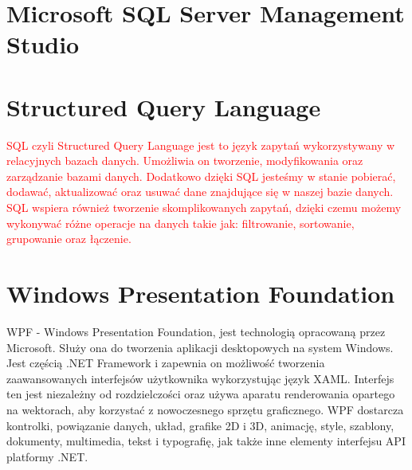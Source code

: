 \documentclass[12pt,oneside]{report}
\begin{document}
\section{Microsoft SQL Server Management Studio}

\section{Structured Query Language}
\textcolor{red} {SQL czyli Structured Query Language jest to język zapytań wykorzystywany w relacyjnych bazach danych. Umożliwia on tworzenie, modyfikowania oraz zarządzanie bazami danych. Dodatkowo dzięki SQL jesteśmy w stanie pobierać, dodawać, aktualizować oraz usuwać dane znajdujące się w naszej bazie danych. SQL wspiera również tworzenie skomplikowanych zapytań, dzięki czemu możemy wykonywać różne operacje na danych takie jak: filtrowanie, sortowanie, grupowanie oraz łączenie.}

\section{Windows Presentation Foundation}
WPF - Windows Presentation Foundation, jest technologią opracowaną przez Microsoft. Służy ona do tworzenia aplikacji desktopowych na system Windows. Jest częścią .NET Framework i zapewnia on możliwość tworzenia zaawansowanych interfejsów użytkownika wykorzystując język XAML. Interfejs ten jest niezależny od rozdzielczości oraz używa aparatu renderowania opartego na wektorach, aby korzystać z nowoczesnego sprzętu graficznego. WPF dostarcza kontrolki, powiązanie danych, układ, grafike 2D i 3D, animację, style, szablony, dokumenty, multimedia, tekst i typografię, jak także inne elementy interfejsu API platformy .NET. \cite{WPF}
\end{document}
